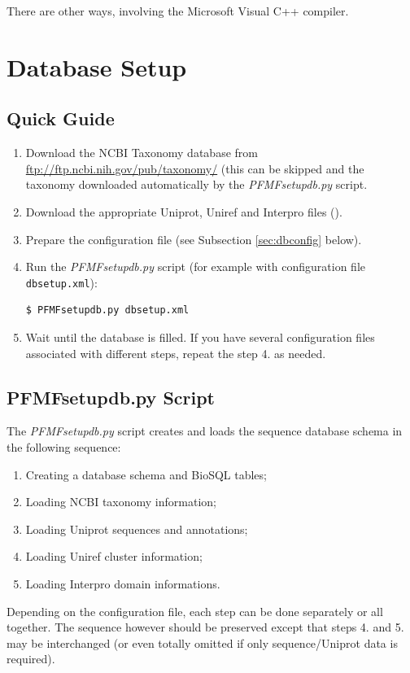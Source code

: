 \documentclass[11pt]{article}
\begin{document}
There are other ways, involving the Microsoft Visual C++ compiler.

\section{Database Setup}

\subsection{Quick Guide}

\begin{enumerate}
\item Download the NCBI Taxonomy database from \url{ftp://ftp.ncbi.nih.gov/pub/taxonomy/} (this can be skipped and the taxonomy downloaded automatically by the {\it PFMFsetupdb.py} script.
\item Download the appropriate Uniprot, Uniref and Interpro files ().
\item Prepare the configuration file (see Subsection \ref{sec:dbconfig} below).
\item Run the {\it PFMFsetupdb.py} script (for example with configuration file {\tt dbsetup.xml}):
\begin{verbatim}
$ PFMFsetupdb.py dbsetup.xml
\end{verbatim}
\item Wait until the database is filled. If you have several configuration files associated with different steps, repeat the step 4. as needed.
\end{enumerate}

\subsection{PFMFsetupdb.py Script}

The {\it PFMFsetupdb.py} script creates and loads the sequence database schema in the following sequence:
\begin{enumerate}
\item Creating a database schema and BioSQL tables;
\item Loading NCBI taxonomy information;
\item Loading Uniprot sequences and annotations;
\item Loading Uniref cluster information;
\item Loading Interpro domain informations.
\end{enumerate}
Depending on the configuration file, each step can be done separately or all together. The sequence however should be preserved except that steps 4. and 5. may be interchanged (or even totally omitted if only sequence/Uniprot data is required).
\end{document}
